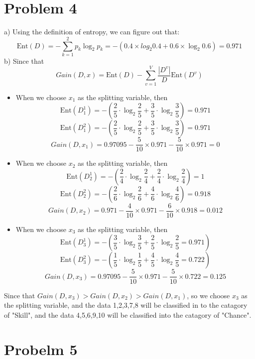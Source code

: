 \documentclass{article}
\begin{document}
\section*{Problem 4}
a) Using the definition of entropy, we can figure out that:
\[ \mathrm{Ent}(D) = -\sum_{k=1}^{2}p_k\log_2 p_k = -(0.4\times log_2 0.4 +0.6\times \log_2 0.6) = 0.971\]
b) Since that \[Gain(D,x) = \mathrm{Ent}(D) - \sum_{v=1}^{V} \frac{|D^v|}{D}\mathrm{Ent}(D^v)\] 
\begin{itemize}
	\item When we choose $x_1$ as the splitting variable, then 
	\[ \mathrm{Ent}(D_1^1) = -(\frac{2}{5} \cdot \log_2 \frac{2}{5} + \frac{3}{5} \cdot \log_2 \frac{3}{5}) = 0.971 \]
	\[ \mathrm{Ent}(D_1^2) = -(\frac{2}{5} \cdot \log_2 \frac{2}{5} + \frac{3}{5} \cdot \log_2 \frac{3}{5}) = 0.971 \]
	\[Gain(D,x_1) = 0.97095 - \frac{5}{10} \times 0.971 - \frac{5}{10} \times 0.971 = 0 \] 
	\item When we choose $x_2$ as the splitting variable, then
	\[ \mathrm{Ent}(D_2^1) = -(\frac{2}{4} \cdot \log_2 \frac{2}{4} + \frac{2}{4} \cdot \log_2 \frac{2}{4}) = 1 \]
	\[ \mathrm{Ent}(D_2^2) = -(\frac{2}{6} \cdot \log_2 \frac{2}{6} + \frac{4}{6} \cdot \log_2 \frac{4}{6}) = 0.918 \]
	\[Gain(D,x_2) = 0.971 - \frac{4}{10} \times 0.971 - \frac{6}{10} \times 0.918 = 0.012 \] 
	\item When we choose $x_3$ as the splitting variable, then
	\[ \mathrm{Ent}(D_3^1) = -(\frac{3}{5} \cdot \log_2 \frac{3}{5} + \frac{2}{5} \cdot \log_2 \frac{2}{5} = 0.971) \]
	\[ \mathrm{Ent}(D_3^2) = -(\frac{1}{5} \cdot \log_2 \frac{1}{5} + \frac{4}{5} \cdot \log_2 \frac{4}{5} = 0.722) \]
	\[Gain(D,x_3) = 0.97095 - \frac{5}{10} \times 0.971 - \frac{5}{10} \times 0.722 = 0.125 \] 
\end{itemize}
Since that $Gain(D,x_3) >Gain(D,x_2)>Gain(D,x_1)$, so we choose $x_3$ as the splitting variable, and the data 1,2,3,7,8 will be classified in to the catagory of "Skill", and the data 4,5,6,9,10 will be classified into the catagory of "Chance".
\section*{Probelm 5}


\small


\end{document}

